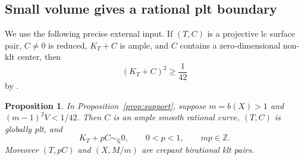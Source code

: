 \documentclass[12pt,a4paper]{article}
\numberwithin{equation}{section}
\newtheorem{proposition}[theorem]{Proposition}
\theoremstyle{definition}
\newcommand{\Q}{\mathbb Q}
\newcommand{\Z}{\mathbb Z}
\begin{document}
\subsection{Small volume gives a rational plt boundary}

We use the following precise external input.
If \((T,C)\) is a projective lc surface pair, \(C\ne0\) is reduced,
\(K_T+C\) is ample, and \(C\) contains a zero-dimensional non-klt
center, then
\begin{equation}\label{eq:Liu-Shao}
                         (K_T+C)^2\geq\frac1{42}
\end{equation}
by \cite[Theorem 1.3]{LS26}.

\begin{proposition}\label{prop:small-support}
In Proposition~\ref{prop:support}, suppose \(m=b(X)>1\) and
\((m-1)^2V<1/42\). Then \(C\) is an ample smooth rational curve,
\((T,C)\) is globally plt, and
\begin{equation}\label{eq:support-p}
               K_T+pC\sim_{\Q}0,\qquad 0<p<1,\qquad mp\in\Z.
\end{equation}
Moreover \((T,pC)\) and \((X,M/m)\) are crepant birational klt pairs.
\end{proposition}
\end{document}
